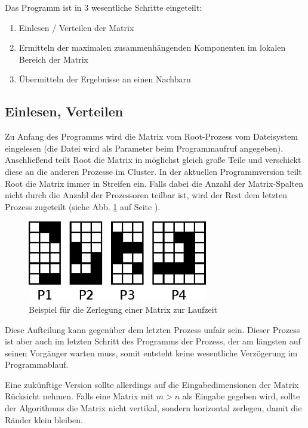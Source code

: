 Das Programm ist in 3 wesentliche Schritte eingeteilt:

\begin{enumerate}
	\item Einlesen / Verteilen der Matrix
	\item Ermitteln der maximalen zusammenhängenden Komponenten im lokalen Bereich der Matrix
	\item Übermitteln der Ergebnisse an einen Nachbarn
\end{enumerate}

\subsection{Einlesen, Verteilen}

Zu Anfang des Programms wird die Matrix vom Root-Prozess vom Dateisystem eingelesen (die Datei wird als Parameter beim Programmaufruf angegeben). Anschließend teilt Root die Matrix in möglichst gleich große Teile und verschickt diese an die anderen Prozesse im Cluster. In der aktuellen Programmversion teilt Root die Matrix immer in Streifen ein. Falls dabei die Anzahl der Matrix-Spalten nicht durch die Anzahl der Prozessoren teilbar ist, wird der Rest dem letzten Prozess zugeteilt (siehe Abb. \ref{fig:matrix_zerteilung} auf Seite \pageref{fig:matrix_zerteilung}).

\begin{figure}[tbhp]
	\centering
	\includegraphics[width=0.7\textwidth]{images/matrix_split.eps}
	\caption{Beispiel für die Zerlegung einer Matrix zur Laufzeit}
	\label{fig:matrix_zerteilung}
\end{figure}

Diese Aufteilung kann gegenüber dem letzten Prozess unfair sein. Dieser Prozess ist aber auch im letzten Schritt des Programms der Prozess, der am längsten auf seinen Vorgänger warten muss, somit entsteht keine wesentliche Verzögerung im Programmablauf.

Eine zukünftige Version sollte allerdings auf die Eingabedimensionen der Matrix Rücksicht nehmen. Falls eine Matrix mit $m > n$ als Eingabe gegeben wird, sollte der Algorithmus die Matrix nicht vertikal, sondern horizontal zerlegen, damit die Ränder klein bleiben.

